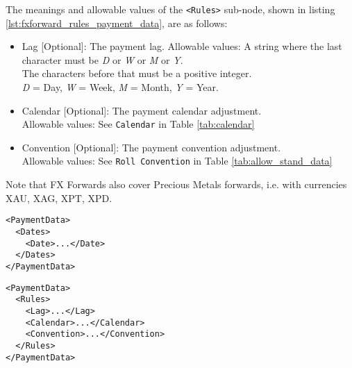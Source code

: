 The meanings and allowable values of the \lstinline!<Rules>! sub-node, shown in listing \ref{lst:fxforward_rules_payment_data}, are as follows:

\begin{itemize}
	\item Lag [Optional]: The payment lag.
	Allowable values: A string where the last character must be \emph{D} or \emph{W} or \emph{M} or \emph{Y}. \\ The characters before that must be a positive integer. \\ \emph{D} = Day, \emph{W} = Week, \emph{M} = Month, \emph{Y} = Year.

	\item Calendar [Optional]: The payment calendar adjustment. \\
	Allowable values: See \lstinline!Calendar! in Table \ref{tab:calendar}

	\item Convention [Optional]: The payment convention adjustment. \\
	Allowable values: See \lstinline!Roll Convention! in Table \ref{tab:allow_stand_data}
\end{itemize}

Note that FX Forwards also cover Precious Metals forwards, i.e. with
currencies XAU, XAG, XPT, XPD.

\begin{listing}[H]
\begin{verbatim}
<PaymentData>
  <Dates>
    <Date>...</Date>
  </Dates>
</PaymentData>
\end{verbatim}
\caption{Dates based \lstinline!PaymentData!}
\label{lst:fxforward_dates_payment_data}
\end{listing}

\begin{listing}[H]
\begin{verbatim}
<PaymentData>
  <Rules>
    <Lag>...</Lag>
    <Calendar>...</Calendar>
    <Convention>...</Convention>
  </Rules>
</PaymentData>
\end{verbatim}
\caption{Rules based \lstinline!PaymentData!}
\label{lst:fxforward_rules_payment_data}
\end{listing}